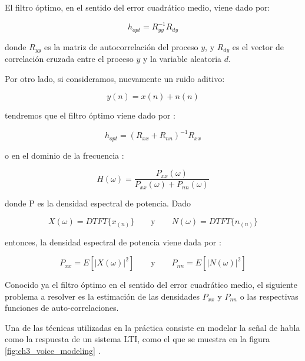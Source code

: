 El filtro óptimo, en el sentido del error cuadrático medio, viene dado por:

\begin{equation*}
	h_{opt} = R_{yy}^{-1} R_{dy}
\end{equation*}

\noindent donde $R_{yy}$ es la matriz de autocorrelación del proceso $y$, y $ R_{dy}$ es el vector de correlación cruzada entre el proceso $y$ y la variable aleatoria $d$.

Por otro lado, si consideramos, nuevamente un ruido aditivo:

\begin{equation*}
	y(n) = x(n) + n(n)
\end{equation*}

\noindent tendremos que el filtro óptimo viene dado por \cite{speech_enhancement_theory_and_practice}:

\begin{equation*}
	h_{opt} = \left( R_{xx} + R_{nn} \right)^{-1} R_{xx}
\end{equation*}

\noindent o en el dominio de la frecuencia \cite{speech_enhancement_theory_and_practice}:

\begin{equation*}
	H(\omega) = \frac{P_{xx}(\omega)}{P_{xx}(\omega) + P_{nn}(\omega)}
\end{equation*}

\noindent donde P es la densidad espectral de potencia. Dado

\begin{equation*}
	X(\omega) = DTFT\{ x_{(n)} \} \qquad \text{y} \qquad N(\omega) = DTFT\{ n_{(n)} \}
\end{equation*}

\noindent entonces, la densidad espectral de potencia viene dada por \cite{intuitive_probability_and_random_processes_using_matlab}:

\begin{equation*}
	P_{xx} = E[ | X(\omega) |^2 ] \qquad \text{y} \qquad P_{nn} = E[ | N(\omega) |^2 ]
\end{equation*}

Conocido ya el filtro óptimo en el sentido del error cuadrático medio, el siguiente problema a resolver es la estimación de las densidades $P_{xx}$ y $P_{nn}$ o las respectivas funciones de auto-correlaciones.

Una de las técnicas utilizadas en la práctica consiste en modelar la señal de habla como la respuesta de un sistema LTI, como el que se muestra en la figura \ref{fig:ch3_voice_modeling} \cite{spoken_language_processing}. 

